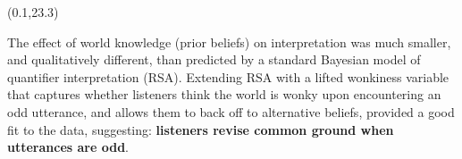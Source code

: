 \documentclass[a0,portrait]{a0poster}
\newcommand{\red}[1]{\textcolor{Red}{#1}}
\newcommand{\white}[1]{\textcolor{white}{#1}}
\newcommand{\superlightgray}[1]{\textcolor{superlightgray}{#1}}
\def\LHead#1{\noindent{\LARGE\color{myBlue} #1}}
\begin{document}
\begin{textblock}{7}
\begin{textblock}{3.1}
\end{textblock} 

%
%
\end{textblock} 



\begin{textblock}{7}(0.1,23.3)
\LHead{Conclusion}

\large
The effect of  world knowledge (prior beliefs) on interpretation was much smaller, and qualitatively different, than predicted by a standard Bayesian model of quantifier interpretation (RSA). Extending RSA with a lifted wonkiness variable that captures whether listeners think the world is wonky upon encountering an odd utterance, and allows them to back off to alternative beliefs, provided a good fit to the data, suggesting: \textbf{listeners revise common ground when utterances are odd}. %


\end{textblock} 

%  
%
%  
%
\end{document}
